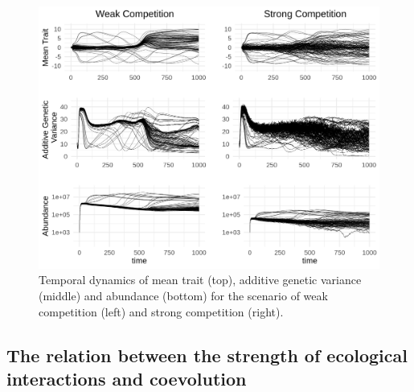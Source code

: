 \documentclass[]{article}
\begin{document}
\begin{figure}

{\centering \includegraphics[width=1\linewidth]{community_dynamics} 

}

\caption{\label{temporal}Temporal dynamics of mean trait (top), additive genetic variance (middle) and abundance (bottom) for the scenario of weak competition (left) and strong competition (right).}\label{fig:unnamed-chunk-6}
\end{figure}

\hypertarget{the-relation-between-the-strength-of-ecological-interactions-and-coevolution}{%
\subsection{\texorpdfstring{The relation between the strength of
ecological interactions and coevolution
\label{ecoevo}}{The relation between the strength of ecological interactions and coevolution }}\label{the-relation-between-the-strength-of-ecological-interactions-and-coevolution}}
\end{document}
